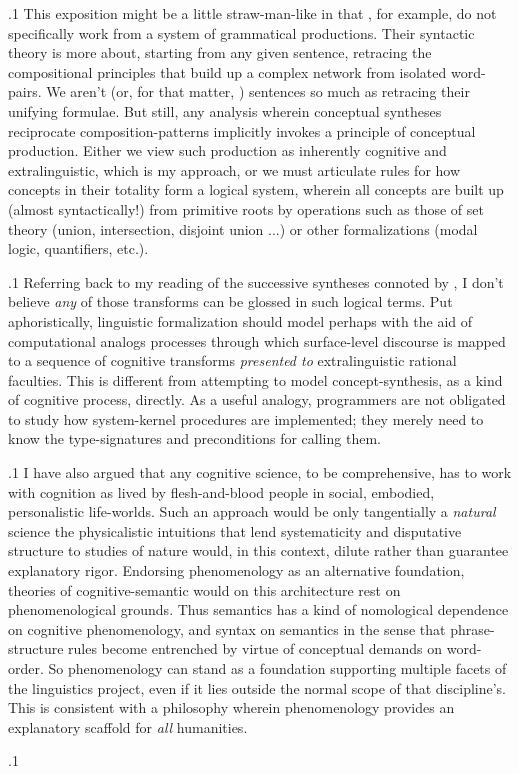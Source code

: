 \documentclass[11pt, twocolumn]{article}
\begin{document}
\p.1{%
\:\+This exposition might be a little straw-man-like in that \Boltetal{},
for example, do not specifically work from a system of grammatical
productions. \> Their syntactic theory is more about, starting
from any given sentence, retracing the compositional principles
that build up a complex network from isolated 
word-pairs. \> We aren't  (or, for that 
matter, ) sentences
so much as retracing their unifying formulae. \> But still,
any analysis wherein conceptual syntheses
reciprocate composition-patterns implicitly invokes a
principle of conceptual production. \> Either 
we view such production as inherently cognitive and extralinguistic, which is
my approach, or we must articulate rules for how concepts
in their totality form a logical system, wherein all concepts are
built up (almost syntactically!) from primitive roots by operations such as
those of set theory (union, intersection, disjoint union ...)
or other formalizations (modal logic, quantifiers, etc.).\<\;
} %

\p.1{%
\:\+Referring back to my reading of the successive syntheses
connoted by , I don't believe
\textit{any} of those transforms can be glossed in such logical 
terms. \> Put aphoristically, linguistic formalization should model
\mdash{} perhaps with the aid of computational analogs \mdash{} processes
through which surface-level discourse is mapped to a sequence
of cognitive transforms \textit{presented to} extralinguistic
rational faculties. \> This is different from attempting
to model concept-synthesis, as a kind of
 cognitive process,
directly. \> As a useful analogy, programmers are not obligated to
study how system-kernel procedures are implemented; they merely
need to know the type-signatures and preconditions 
for calling them.\<\;
} %

\p.1{%
\:\+I have also argued that any cognitive
science, to be comprehensive, has to work
with cognition as lived by flesh-and-blood
people in social, embodied, personalistic 
life-worlds. \> Such an approach would be only tangentially a
\textit{natural} science \mdash{} the physicalistic
intuitions that lend systematicity
and \pgl{}disputative structure to studies of nature
would, in this context, dilute rather than
guarantee explanatory rigor. \> Endorsing
phenomenology as an alternative foundation,
theories of cognitive-semantic 
would \mdash{} on this architecture \mdash{} rest on phenomenological
grounds. \> Thus semantics has a
kind of nomological dependence
on cognitive phenomenology, and
syntax on semantics in the sense
that phrase-structure rules become entrenched
by virtue of conceptual demands on word-order. \> So 
phenomenology can stand as a foundation
supporting multiple facets of the
linguistics project, even if it
lies outside the normal scope of that
discipline's. \> This is consistent with a
philosophy wherein
phenomenology provides an explanatory
scaffold for \textit{all} humanities.\<\;
} %

\pa.1{%

} %
\end{document}
